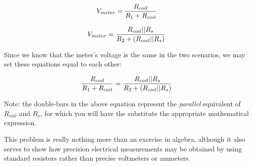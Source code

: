 $$V_{meter} = {R_{coil} \over {R_1 + R_{coil}}}$$

$$V_{meter} = {R_{coil} || R_s \over {R_2 + (R_{coil} || R_s)}}$$

Since we know that the meter's voltage is the same in the two scenarios, we may set these equations equal to each other:

$${R_{coil} \over {R_1 + R_{coil}}} = {R_{coil} || R_s \over {R_2 + (R_{coil} || R_s)}}$$

Note: the double-bars in the above equation represent the {\it parallel} equivalent of $R_{coil}$ and $R_s$, for which you will have the substitute the appropriate mathematical expression.







This problem is really nothing more than an exercise in algebra, although it also serves to show how precision electrical measurements may be obtained by using standard resistors rather than precise voltmeters or ammeters.




